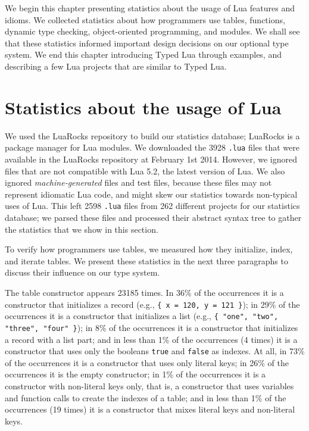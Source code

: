 We begin this chapter presenting statistics about the usage of Lua
features and idioms.
We collected statistics about how programmers use tables, functions,
dynamic type checking, object-oriented programming, and modules.
We shall see that these statistics informed important design decisions
on our optional type system.
We end this chapter introducing Typed Lua through examples, and
describing a few Lua projects that are similar to Typed Lua.

\section{Statistics about the usage of Lua}
\label{sec:statistics}

We used the LuaRocks repository to build our statistics database;
LuaRocks \citep{hisham2013luarocks} is a package manager for Lua
modules.
We downloaded the 3928 \texttt{.lua} files that were available in
the LuaRocks repository at February 1st 2014.
However, we ignored files that are not compatible with Lua 5.2,
the latest version of Lua.
We also ignored \emph{machine-generated} files and test files,
because these files may not represent idiomatic Lua code,
and might skew our statistics towards non-typical uses of Lua.
This left 2598 \texttt{.lua} files from 262 different projects for
our statistics database;
we parsed these files and processed their abstract syntax tree
to gather the statistics that we show in this section.

To verify how programmers use tables, we measured how they
initialize, index, and iterate tables.
We present these statistics in the next three paragraphs to discuss
their influence on our type system.

The table constructor appears 23185 times.
In 36\% of the occurrences it is a constructor that initializes a
record (e.g., \texttt{\{ x = 120, y = 121 \}});
in 29\% of the occurrences it is a constructor that initializes a
list (e.g., \texttt{\{ "one", "two", "three", "four" \}});
in 8\% of the occurrences it is a constructor that initializes a
record with a list part;
and in less than 1\% of the occurrences (4 times) it is a constructor
that uses only the booleans \texttt{true} and \texttt{false} as indexes.
At all, in 73\% of the occurrences it is a constructor that uses
only literal keys;
in 26\% of the occurrences it is the empty constructor;
in 1\% of the occurrences it is a constructor with non-literal keys
only, that is, a constructor that uses variables and function calls
to create the indexes of a table;
and in less than 1\% of the occurrences (19 times) it is a constructor
that mixes literal keys and non-literal keys.

